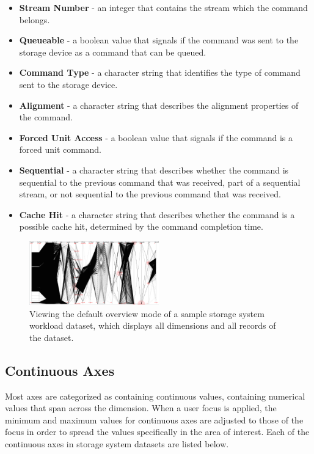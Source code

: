 \documentclass[journal]{vgtc}                %
\begin{document}
\begin{itemize}
\item \textbf{Stream Number} - an integer that contains the stream which the command belongs.

\item \textbf{Queueable} - a boolean value that signals if the command was sent to the storage device as a command that can be queued. 

\item \textbf{Command Type} - a character string that identifies the type of command sent to the storage device.

\item \textbf{Alignment} - a character string that describes the alignment properties of the command.

\item \textbf{Forced Unit Access} - a boolean value that signals if the command is a forced unit command.

\item \textbf{Sequential} - a character string that describes whether the command is sequential to the previous command that was received, part of a sequential stream, or not sequential to the previous command that was received.

\item \textbf{Cache Hit} - a character string that describes whether the command is a possible cache hit, determined by the command completion time.
\end{itemize}

\begin{figure}[h!]
 \centering
 \includegraphics[width=0.5\textwidth]{images/overview.eps}
 \caption[Overview mode of a sample storage system workload dataset.]{Viewing the default overview mode of a sample storage system workload dataset, which displays all dimensions and all records of the dataset.}
 \label{fig:overview}
\end{figure}

\subsection{Continuous Axes}
Most axes are categorized as containing continuous values, containing numerical values that span across the dimension. When a user focus is applied, the minimum and maximum values for continuous axes are adjusted to those of the focus in order to spread the values specifically in the area of interest. Each of the continuous axes in storage system datasets are listed below.
\end{document}
